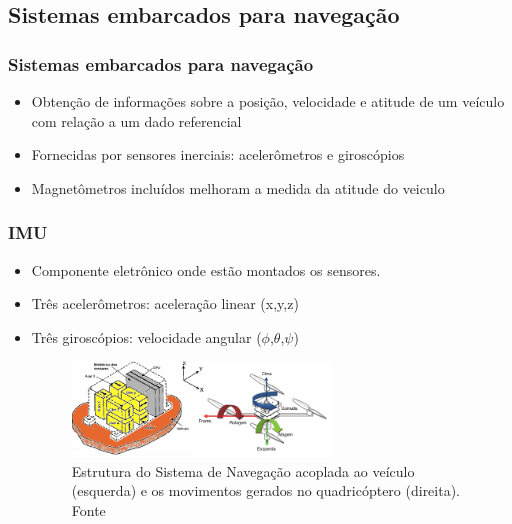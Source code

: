 \documentclass{beamer}
\begin{document}
\subsection*{Sistemas embarcados para navegação}
\begin{frame}
	
	\frametitle{Sistemas embarcados para navegação}
	
	\begin{itemize}

	\item Obtenção de informações sobre a posição, velocidade e atitude de um veículo com relação a um dado referencial	
	
	\item Fornecidas por sensores inerciais: acelerômetros e giroscópios
	
	\item Magnetômetros incluídos melhoram a medida da atitude do veiculo	
	
	\end{itemize}
	
\end{frame}	
\begin{frame}
	\frametitle{IMU}
	
	\begin{itemize}
		
		\item Componente eletrônico onde estão montados os sensores. 
		
		\item Três acelerômetros: aceleração linear (x,y,z)
		
		\item Três giroscópios: velocidade angular ($\phi$,$\theta$,$\psi$)
	
	    \vspace{0.5cm}
	
		\begin{figure}[h]
			\centering
			\includegraphics[keepaspectratio = true,
			width=0.65\textwidth]{img/imuStrap.png}
			\caption{Estrutura do Sistema de Navegação acoplada ao veículo (esquerda) e os movimentos gerados no quadricóptero (direita). Fonte \cite{Adalberto2009}}
			\label{fig:imuStrap}
		\end{figure}
	\end{itemize}
\end{frame}
\end{document}
